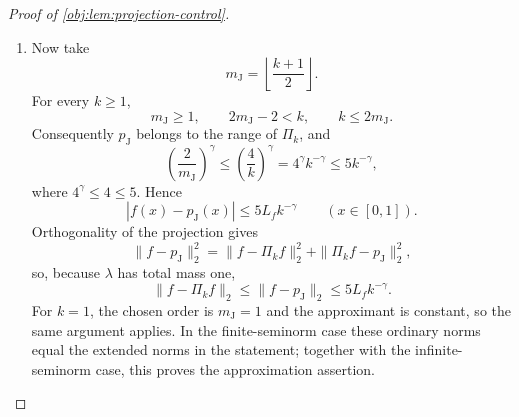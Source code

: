 \documentclass[11pt]{article}
\begin{document}
\begin{proof}[Proof of \cref{obj:lem:projection-control}]
\begin{enumerate}
It also lies in the cosine span through frequency \(2m_{\mathrm J}-2\). Indeed,
\(\mathsf U_{m_{\mathrm J}-1}^4\) is an even polynomial of degree \(4m_{\mathrm J}-4\); hence there is a polynomial \(\mathcal Q_{m_{\mathrm J}}\) such that
\[
\mathsf U_{m_{\mathrm J}-1}(z)^4
=\mathcal Q_{m_{\mathrm J}}(z^2),
\qquad
\deg\mathcal Q_{m_{\mathrm J}}\le2m_{\mathrm J}-2.
\]
Since \(\cos(\vartheta/2)^2=(1+\cos\vartheta)/2\),
\[
\mathcal J_{m_{\mathrm J}}(\vartheta)
=
\frac{\mathcal Q_{m_{\mathrm J}}((1+\cos\vartheta)/2)}
     {\mathcal Z_{m_{\mathrm J}}}.
\]
Thus the kernel is an even trigonometric polynomial. Averaging its trigonometric expansion at \(\vartheta\) and \(-\vartheta\) removes the sine terms, giving real coefficients
\(\mathfrak a_{m_{\mathrm J},j}\), \(0\le j\le2m_{\mathrm J}-2\), with
\[
\mathcal J_{m_{\mathrm J}}(\vartheta)
=\sum_{j=0}^{2m_{\mathrm J}-2}
 \mathfrak a_{m_{\mathrm J},j}\cos(j\vartheta).
\]
Reversing the convolution over one period and using the cosine subtraction formula gives
\[
\begin{aligned}
p_{\mathrm J}(x)
&=\int_{-\pi}^{\pi}
 \bar f(\vartheta)\mathcal J_{m_{\mathrm J}}(\pi x-\vartheta)\,d\vartheta\\
&=\sum_{j=0}^{2m_{\mathrm J}-2}
 \left\{\mathfrak a_{m_{\mathrm J},j}
 \int_{-\pi}^{\pi}\bar f(\vartheta)\cos(j\vartheta)\,d\vartheta\right\}
 \cos(\pi jx).
\end{aligned}
\]
The sine integrals vanish because \(\bar f\) is even. The reversal follows by a change of variable and periodicity. Since \(\varphi_0=1\) and
\(\varphi_j(x)=\sqrt2\cos(\pi jx)\) for \(j\ge1\), this is the required cosine-span representation.

\item Now take
\[
m_{\mathrm J}=\left\lfloor\frac{k+1}{2}\right\rfloor.
\]
For every \(k\ge1\),
\[
m_{\mathrm J}\ge1,\qquad
2m_{\mathrm J}-2<k,\qquad
k\le2m_{\mathrm J}.
\]
Consequently \(p_{\mathrm J}\) belongs to the range of \(\Pi_k\), and
\[
\left(\frac{2}{m_{\mathrm J}}\right)^\gamma
\le\left(\frac4k\right)^\gamma
=4^\gamma k^{-\gamma}
\le5k^{-\gamma},
\]
where \(4^\gamma\le4\le5\). Hence
\[
|f(x)-p_{\mathrm J}(x)|\le5L_fk^{-\gamma}
\qquad(x\in[0,1]).
\]
Orthogonality of the projection gives
\[
\|f-p_{\mathrm J}\|_2^2
=\|f-\Pi_kf\|_2^2+\|\Pi_kf-p_{\mathrm J}\|_2^2,
\]
so, because \(\lambda\) has total mass one,
\[
\|f-\Pi_kf\|_2
\le\|f-p_{\mathrm J}\|_2
\le5L_fk^{-\gamma}.
\]
For \(k=1\), the chosen order is \(m_{\mathrm J}=1\) and the approximant is constant, so the same argument applies. In the finite-seminorm case these ordinary norms equal the extended norms in the statement; together with the infinite-seminorm case, this proves the approximation assertion.


\end{enumerate}
\end{proof}
\end{document}
